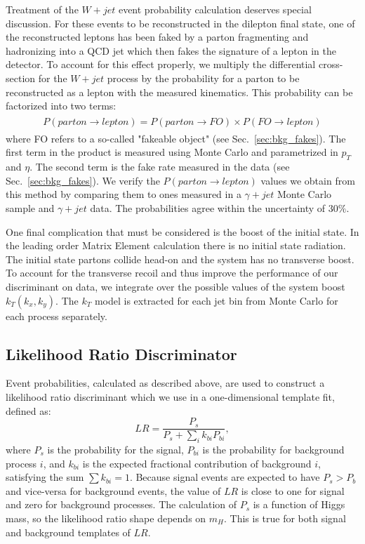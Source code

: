 Treatment of the $W+jet$ event probability calculation deserves special discussion.
For these events to be reconstructed in the dilepton final state,
one of the reconstructed leptons has been faked by a parton fragmenting and hadronizing 
into a QCD jet which then fakes the signature of a lepton in the detector. To account for this 
effect properly, we multiply the differential cross-section for the $W+jet$ process by the 
probability for a parton to be reconstructed as a lepton with the measured kinematics. 
This probability can be factorized into two terms:
\begin{eqnarray}
\begin{array}{lcl}
P(parton\rightarrow lepton)=P(parton\rightarrow FO)\times P(FO\rightarrow lepton)
\end{array} 
\end{eqnarray} 
where FO refers to a so-called "fakeable object" (see Sec.~\ref{sec:bkg_fakes}). 
The first term in the product is measured using Monte Carlo and parametrized
in $p_{T}$ and $\eta$.  The second term is the fake rate measured in the data 
(see Sec.~\ref{sec:bkg_fakes}).
We verify the $P(parton\rightarrow lepton)$ values we obtain from this method by 
comparing them to ones measured in a $\gamma+jet$ Monte Carlo sample and $\gamma+jet$ data.
The probabilities agree within the uncertainty of $30\%$.  

One final complication that must be considered is the boost of the initial state.
In the leading order Matrix Element calculation there is no initial state radiation. 
The initial state partons collide head-on and the system has no transverse boost. 
To account for the transverse recoil and thus improve the performance of our discriminant
on data, we integrate over the possible values of the system boost $k_{T}(k_{x},k_{y})$. 
The $k_T$ model is extracted for each jet bin from Monte Carlo for each process separately. 

\subsection{Likelihood Ratio Discriminator}
Event probabilities, calculated as described above, are used to construct 
a likelihood ratio discriminant which we use in a one-dimensional template fit, defined as:
\begin{equation}
\label{eqn:LR}
LR = \frac { P_s} { P_s + \sum_i k_{bi} P_{bi}},
\end{equation}
where $P_s$  is the probability for the signal, $P_{bi}$ is the probability for background
process $i$, and
$k_{bi}$ is the expected fractional contribution of background $i$,
satisfying the sum $\sum k_{bi} =1$.
Because signal events are expected to have $P_s>P_b$ and vice-versa for background events, 
the value of $LR$ is close to one for signal and zero for background processes.
The calculation of $P_s$ is a function of Higgs mass, so the likelihood ratio
shape depends on $m_H$. This is true for both signal and background templates of $LR$. 


